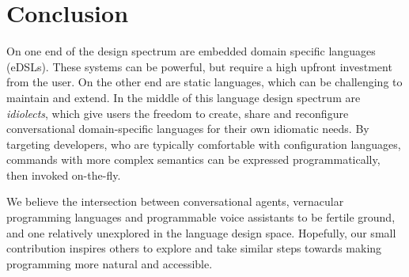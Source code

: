 \documentclass{article}
\theoremstyle{plain}
\theoremstyle{definition}
\theoremstyle{remark}
\begin{document}
%
%


\section{Conclusion}

%


On one end of the design spectrum are embedded domain specific languages (eDSLs). These systems can be powerful, but require a high upfront investment from the user. On the other end are static languages, which can be challenging to maintain and extend. In the middle of this language design spectrum are \textit{idiolects}, which give users the freedom to create, share and reconfigure conversational domain-specific languages for their own idiomatic needs. By targeting developers, who are typically comfortable with configuration languages, commands with more complex semantics can be expressed programmatically, then invoked on-the-fly.

We believe the intersection between conversational agents, vernacular programming languages and programmable voice assistants to be fertile ground, and one relatively unexplored in the language design space. Hopefully, our small contribution inspires others to explore and take similar steps towards making programming more natural and accessible.

\nocite{langley00}



\end{document}
